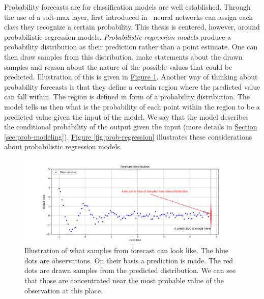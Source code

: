\documentclass[12pt,a4paper,twoside]{scrartcl}
\numberwithin{equation}{section}
\newcommand{\reffig}[1]{\hyperref[#1]{Figure \ref*{#1}}}
\newcommand{\refsec}[1]{\hyperref[#1]{Section \ref*{#1}}}
\begin{document}
Probability forecasts are for classification models are well established. Through the use of a soft-max layer, first introduced in~\cite{denker1990} neural networks can assign each class they recognize a certain probability. This thesis is centered, however, around probabilistic regression models. \emph{Probabilistic regression models} produce a probability distribution as their prediction rather than a point estimate. One can then draw samples from this distribution, make statements about the drawn samples and reason about the nature of the possible values that could be predicted. Illustration of this is given in \reffig{fig:pred-dist-draws}. Another way of thinking about probability forecasts is that they define a certain region where the predicted value can fall within. The region is defined in form of a probability distribution. The model tells us then what is the probability of each point within the region to be a predicted value given the input of the model. We say that the model describes the conditional probability of the output given the input (more details in \refsec{sec:prob-modeling}). \reffig{fig:prob-regression} illustrates these considerations about probabilistic regression models.
\begin{center}
  \begin{figure}[H]
    \centering
    \includegraphics[height=0.5\textwidth, width=1.0\textwidth]{figures/forecast.png}
    \caption[Forecast sample draws]{Illustration of what samples from forecast can look like. The blue dots are observations. On their basis a prediction is made. The red dots are drawn samples from the predicted distribution. We can see that those are concentrated near the most probable value of the observation at this place.}\label{fig:pred-dist-draws}
  \end{figure}
\end{center}
\end{document}

